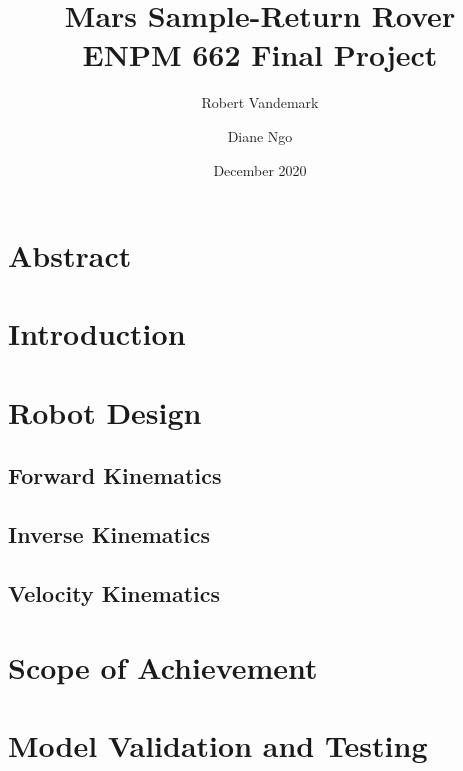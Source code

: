 \documentclass[a4paper, 12pt]{report}
\title{Mars Sample-Return Rover \\
\large ENPM 662 Final Project}
\date{December 2020}
\author{Robert Vandemark \and Diane Ngo}
\begin{document}
	
	\setcounter{page}{1}
	\maketitle
	
	\tableofcontents
	\newpage
	
	\chapter{Abstract}
	
	
	\chapter{Introduction}
	
	
	\chapter{Robot Design}
	
	\section{Forward Kinematics}
	

	\section{Inverse Kinematics}
		
	\section{Velocity Kinematics}
	
	\chapter{Scope of Achievement}
	
	\chapter{Model Validation and Testing}
	
	\begin{center}
		\printbibliography[heading=bibintoc, title={Bibliography}]
	\end{center}
\end{document}
